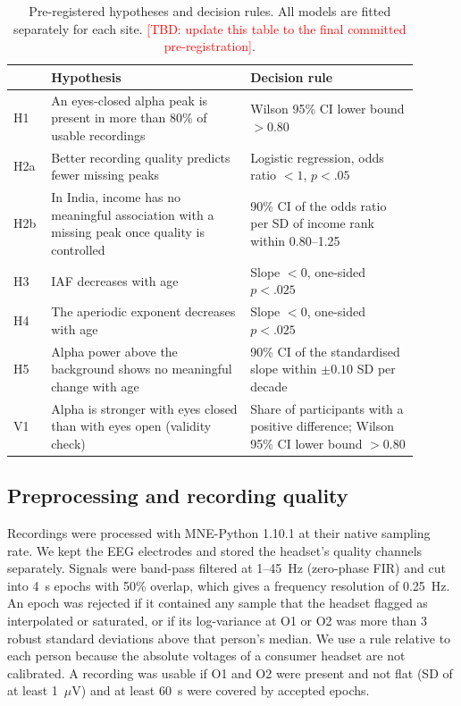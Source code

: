 \documentclass[11pt,a4paper]{article}
\newcommand{\TBD}[1]{\textcolor{red}{[TBD: #1]}}
\begin{document}
\begin{table}[ht]
\centering
\caption{Pre-registered hypotheses and decision rules. All models are fitted separately
for each site. \TBD{update this table to the final committed pre-registration}.}
\label{tab:hyp}
\begin{tabular}{p{0.07\linewidth}p{0.45\linewidth}p{0.38\linewidth}}
\toprule
 & Hypothesis & Decision rule \\
\midrule
H1 & An eyes-closed alpha peak is present in more than 80\% of usable recordings &
Wilson 95\% CI lower bound $> 0.80$ \\
H2a & Better recording quality predicts fewer missing peaks & Logistic regression, odds
ratio $< 1$, $p < .05$ \\
H2b & In India, income has no meaningful association with a missing peak once quality is
controlled & 90\% CI of the odds ratio per SD of income rank within 0.80--1.25 \\
H3 & IAF decreases with age & Slope $< 0$, one-sided $p < .025$ \\
H4 & The aperiodic exponent decreases with age & Slope $< 0$, one-sided $p < .025$ \\
H5 & Alpha power above the background shows no meaningful change with age & 90\% CI of the
standardised slope within $\pm 0.10$ SD per decade \\
V1 & Alpha is stronger with eyes closed than with eyes open (validity check) & Share of
participants with a positive difference; Wilson 95\% CI lower bound $> 0.80$ \\
\bottomrule
\end{tabular}
\end{table}

\subsection{Preprocessing and recording quality}
\label{sec:preproc}

Recordings were processed with MNE-Python 1.10.1 \citep{gramfort2013} at their native
sampling rate. We kept the EEG electrodes and stored the headset's quality channels
separately. Signals were band-pass filtered at 1--45~Hz (zero-phase FIR) and cut into 4~s
epochs with 50\% overlap, which gives a frequency resolution of 0.25~Hz. An epoch was
rejected if it contained any sample that the headset flagged as interpolated or saturated,
or if its log-variance at O1 or O2 was more than 3 robust standard deviations above that
person's median. We use a rule relative to each person because the absolute voltages of a
consumer headset are not calibrated. A recording was usable if O1 and O2 were present and
not flat (SD of at least 1~$\mu$V) and at least 60~s were covered by accepted epochs.
\end{document}
